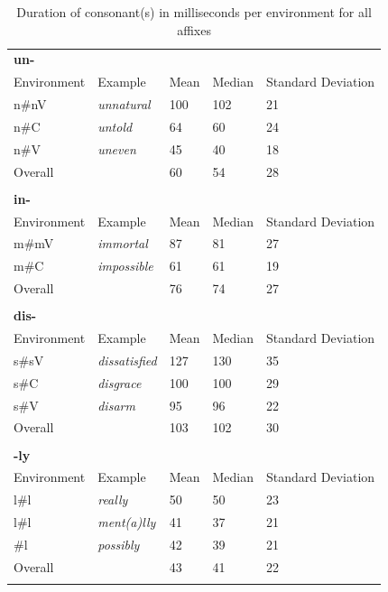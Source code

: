   
  \begin{table}
  	\caption{Duration of consonant(s) in milliseconds per environment for all affixes}
  	\label{tbl:Corpus raw duration}
  	
  		\begin{tabular} {lllll}
  			\lsptoprule
  			\textbf{un-}\\
  			Environment & Example & Mean & Median& Standard Deviation\\
  			\midrule			
  			n\#nV&\color{lsMidBlue}\textit{unnatural} & 100 & 102 & 21\\ 
  			n\#C&\color{lsMidBlue}\textit{untold} & 64 & 60 & 24\\ 
  			n\#V&\color{lsMidBlue}\textit{uneven} & 45 & 40 & 18\\
  			\midrule   	
  			Overall &  & 60 & 54 & 28\\ 
  			\midrule
  			\\
  			\textbf{in-}\\
  			
  			Environment & Example & Mean & Median& Standard Deviation\\
  			\midrule			
  			m\#mV&\color{lsMidBlue}\textit{immortal} & 87 & 81 & 27\\   	
  			m\#C&\color{lsMidBlue}\textit{impossible} & 61 & 61 & 19\\ 
  			\midrule   	
  			Overall &  & 76 & 74 & 27\\ 
  			\midrule   
  			\\
  			\textbf{dis-}\\
  			Environment & Example & Mean & Median& Standard Deviation\\
  			\midrule			
  			s\#sV&\color{lsMidBlue}\textit{dissatisfied} & 127 & 130  &35 \\ 
  			s\#C&\color{lsMidBlue}\textit{disgrace} & 100 & 100& 29\\ 
  			s\#V&\color{lsMidBlue}\textit{disarm} &95 & 96 & 22 \\ 
  			\midrule   	
  			Overall &   &103   & 102  & 30  \\ 
  			\midrule   	
  			\\
  			\textbf{-ly}\\
  			\midrule
  			Environment & Example & Mean & Median& Standard Deviation\\
  			\midrule			
  			l\#l&\color{lsMidBlue}\textit{really} & 50  & 50 & 23 \\ 
  			\isi{syllabic} l\#l&\color{lsMidBlue}\textit{ment(a)lly} &41 & 37  & 21\\ 
  			\#l&\color{lsMidBlue}\textit{possibly} & 42& 39& 21\\ 
  			\midrule   	
  			Overall &  &43  &41 &22\\ 
  			\lspbottomrule                                                                                
		\end{tabular}
  	
  \end{table}
  

